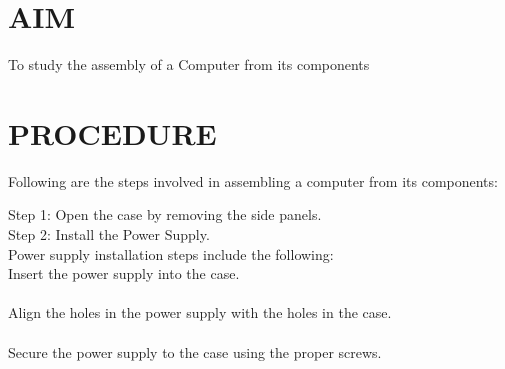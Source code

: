 
\renewcommand{\abstractname}{\Large AIM}
\section*{AIM} \vspace{0.5cm}
To study the assembly of a Computer from its components \vspace{0.5cm}\\
\section*{PROCEDURE\\}
Following are the steps involved in assembling a computer from its components:

{Step 1}: Open the case by removing the side panels.\\

{Step 2}: Install the Power Supply.\\

Power supply installation steps include the following:\\

Insert the power supply into the case.\\
\\Align the holes in the power supply with the holes in the case.\\
\\Secure the power supply to the case using the proper screws.\\


